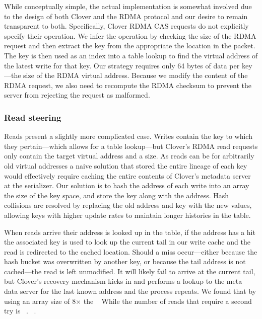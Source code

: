 While conceptually simple, the actual implementation is somewhat
involved due to the design of both Clover and the RDMA protocol and
our desire to remain transparent to both.  Specifically, Clover RDMA
CAS requests do not explicitly specify their operation.  We infer the
operation by checking the size of the RDMA request and then extract
the key from the appropriate the location in the packet.  The key is
then used as an index into a table lookup to find the virtual address
of the latest write for that key.  Our strategy requires only 64 bytes
of data per key---the size of the RDMA virtual address.  Because we
modify the content of the RDMA request, we also need to recompute the
RDMA checksum to prevent the server from rejecting the request as
malformed.


\subsubsection{Read steering}

Reads present a slightly more complicated case. Writes contain the key
to which they pertain---which allows for a table lookup---but Clover's
RDMA read requests only contain the target virtual address and a size.
As reads can be for arbitrarily old virtual addresses a naive solution
that stored the entire lineage of each key would effectively require
caching the entire contents of Clover's metadata server at the
serializer.  Our solution is to hash the address of each write into an
array ~ the size of the key space, and store the key along
with the address.  Hash collisions are resolved by replacing the old
address and key with the new values, allowing keys with higher update
rates to maintain longer histories in the table.

When reads arrive their address is looked up in the table, if the
address has a hit the associated key is used to look up the current
tail in our write cache and the read is redirected to the cached
location.  Should a miss occur---either because the hash bucket was
overwritten by another key, or because the tail address is not
cached---the read is left unmodified.  It will likely fail to arrive
at the current tail, but Clover's recovery mechanism kicks in and
performs a lookup to the meta data server for the last known address
and the process repeats. We found that by using an array size of 8$\times$
the ~ While the number
of reads that require a second try is ~. ~.

